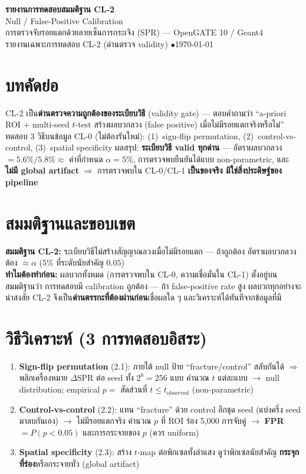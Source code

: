 \documentclass[14pt]{extarticle}
\begin{document}
\begin{center}
{\LARGE\bfseries\color{theme} รายงานการทดสอบสมมติฐาน CL-2}\\[3pt]
{\Large Null / False-Positive Calibration}\\[5pt]
{\small การตรวจจับรอยแตกด้วยลายเซ็นการกระเจิง (SPR) --- OpenGATE 10 / Geant4}\\
{\small รายงานเฉพาะการทดสอบ CL-2 (ด่านตรวจ validity) \quad$\bullet$\quad \today}
\end{center}
\vspace{2pt}{\color{theme!45}\hrule}\vspace{8pt}

\section*{บทคัดย่อ}
CL-2 เป็น\textbf{ด่านตรวจความถูกต้องของระเบียบวิธี} (validity gate) --- ตอบคำถามว่า
``a-priori ROI + multi-seed $t$-test สร้างผลบวกลวง (false positive) เมื่อไม่มีรอยแตกจริงหรือไม่''
ทดสอบ 3 วิธีบนข้อมูล CL-0 (ไม่ต้องรันใหม่): (1)~sign-flip permutation, (2)~control-vs-control,
(3)~spatial specificity ผลสรุป: \textbf{ระเบียบวิธี valid ทุกด่าน} --- อัตราผลบวกลวง
$=5.6\%/5.8\%\approx$ ค่าที่กำหนด $\alpha{=}5\%$, การตรวจพบยืนยันได้แบบ non-parametric, และ
\textbf{ไม่มี global artifact} $\Rightarrow$ การตรวจพบใน CL-0/CL-1 \textbf{เป็นของจริง มิใช่สิ่งประดิษฐ์ของ pipeline}

\section{สมมติฐานและขอบเขต}
\textbf{สมมติฐาน CL-2:} ระเบียบวิธีไม่สร้างสัญญาณลวงเมื่อไม่มีรอยแตก --- ถ้าถูกต้อง อัตราผลบวกลวง
ต้อง $\approx\alpha$ ($5\%$ ที่ระดับนัยสำคัญ $0.05$)\\
\textbf{ทำไมต้องทำก่อน:} ผลบวกทั้งหมด (การตรวจพบใน CL-0, ความเชื่อมั่นใน CL-1) ตั้งอยู่บนสมมติฐานว่า
การทดสอบมี calibration ถูกต้อง --- ถ้า false-positive rate สูง ผลบวกทุกอย่างจะน่าสงสัย
CL-2 จึงเป็น\textbf{ด่านตรรกะที่ต้องผ่านก่อน}เชื่อผลใด ๆ และวิเคราะห์ได้ทันทีจากข้อมูลที่มี

\section{วิธีวิเคราะห์ (3 การทดสอบอิสระ)}
\begin{enumerate}
  \item \textbf{Sign-flip permutation} (2.1): ภายใต้ null ป้าย ``fracture/control'' สลับกันได้
        $\Rightarrow$ พลิกเครื่องหมาย $\Delta$SPR ต่อ seed ทั้ง $2^8{=}256$ แบบ คำนวณ $t$ แต่ละแบบ
        $\to$ null distribution; empirical $p=$ สัดส่วนที่ $t\le t_{\text{observed}}$ (non-parametric)
  \item \textbf{Control-vs-control} (2.2): แทน ``fracture'' ด้วย control อีกชุด seed (แบ่งครึ่ง seed
        มาลบกันเอง) $\to$ ไม่มีรอยแตกจริง คำนวณ $p$ ที่ ROI ร่อง 5{,}000 การจับคู่
        $\to$ \textbf{FPR} $=P(p<0.05)$ และการกระจายของ $p$ (ควร uniform)
  \item \textbf{Spatial specificity} (2.3): สร้าง $t$-map ต่อพิกเซลทั้งลำแสง ดูว่าพิกเซลนัยสำคัญ
        \textbf{กระจุกที่ร่อง}หรือกระจายทั่ว (global artifact)
\end{enumerate}
\end{document}
